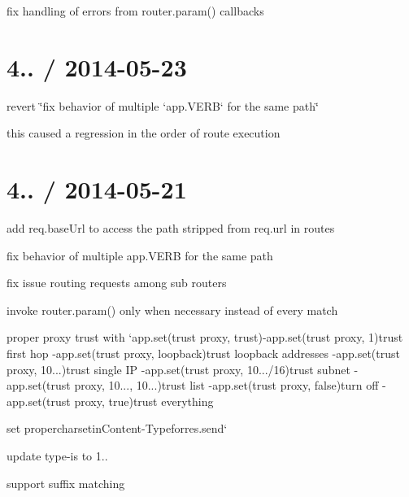 \begin{DoxyItemize}
\item fix handling of errors from {\ttfamily router.\+param()} callbacks
\end{DoxyItemize}

\section*{4.. / 2014-\/05-\/23 }


\begin{DoxyItemize}
\item revert \char`\"{}fix behavior of multiple `app.\+V\+E\+R\+B` for the same path\char`\"{}
\begin{DoxyItemize}
\item this caused a regression in the order of route execution
\end{DoxyItemize}
\end{DoxyItemize}

\section*{4.. / 2014-\/05-\/21 }


\begin{DoxyItemize}
\item add {\ttfamily req.\+base\+Url} to access the path stripped from {\ttfamily req.\+url} in routes
\item fix behavior of multiple {\ttfamily app.\+V\+E\+R\+B} for the same path
\item fix issue routing requests among sub routers
\item invoke {\ttfamily router.\+param()} only when necessary instead of every match
\item proper proxy trust with `app.set(\textquotesingle{}trust proxy\textquotesingle{}, trust){\ttfamily  -\/}app.\+set(\textquotesingle{}trust proxy\textquotesingle{}, 1){\ttfamily trust first hop -\/}app.\+set(\textquotesingle{}trust proxy\textquotesingle{}, \textquotesingle{}loopback\textquotesingle{}){\ttfamily trust loopback addresses -\/}app.\+set(\textquotesingle{}trust proxy\textquotesingle{}, \textquotesingle{}10...\textquotesingle{}){\ttfamily trust single I\+P -\/}app.\+set(\textquotesingle{}trust proxy\textquotesingle{}, \textquotesingle{}10.../16\textquotesingle{}){\ttfamily trust subnet -\/}app.\+set(\textquotesingle{}trust proxy\textquotesingle{}, \textquotesingle{}10..., 10...\textquotesingle{}){\ttfamily trust list -\/}app.\+set(\textquotesingle{}trust proxy\textquotesingle{}, false){\ttfamily turn off -\/}app.\+set(\textquotesingle{}trust proxy\textquotesingle{}, true){\ttfamily trust everything}
\item {\ttfamily set proper}charset{\ttfamily in}Content-\/\+Type{\ttfamily for}res.\+send`
\item update type-\/is to 1..
\begin{DoxyItemize}
\item support suffix matching
\end{DoxyItemize}
\end{DoxyItemize}

